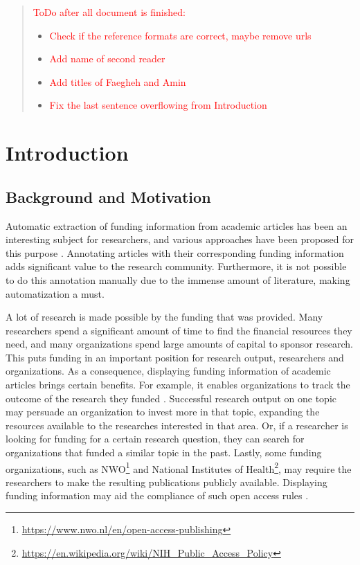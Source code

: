 \documentclass{report}
\theoremstyle{definition}
\theoremstyle{remark}
\begin{document}
\begin{abstract}
    \textcolor{red}{ToDo after all document is finished:}
    \begin{itemize}
        \item \textcolor{red}{Check if the reference formats are correct, maybe remove urls}
        \item \textcolor{red}{Add name of second reader}
        \item \textcolor{red}{Add titles of Faegheh and Amin}
        \item \textcolor{red}{Fix the last sentence overflowing from Introduction}
    \end{itemize}
\end{abstract}



\tableofcontents


\chapter{Introduction}
\label{sec:intro}
\section{Background and Motivation}
Automatic extraction of funding information from academic articles has been an interesting subject for researchers, and various approaches have been proposed for this purpose \cite{ElsPaper,AckExtract,GrantExtractor}. Annotating articles with their corresponding funding information adds significant value to the research community. Furthermore, it is not possible to do this annotation manually due to the immense amount of literature, making automatization a must.

A lot of research is made possible by the funding that was provided. Many researchers spend a significant amount of time to find the financial resources they need, and many organizations spend large amounts of capital to sponsor research. This puts funding in an important position for research output, researchers and organizations. As a consequence, displaying funding information of academic articles brings certain benefits. For example, it enables organizations to track the outcome of the research they funded \cite{ElsPaper}. Successful research output on one topic may persuade an organization to invest more in that topic, expanding the resources available to the researches interested in that area. Or, if a researcher is looking for funding for a certain research question, they can search for organizations that funded a similar topic in the past. Lastly, some funding organizations, such as NWO\footnote{\url{https://www.nwo.nl/en/open-access-publishing}} and National Institutes of Health\footnote{\url{https://en.wikipedia.org/wiki/NIH_Public_Access_Policy}},  may require the researchers to make the resulting publications publicly available. Displaying funding information may aid the compliance of such open access rules \cite{GrantExtractor}. 
\end{document}

